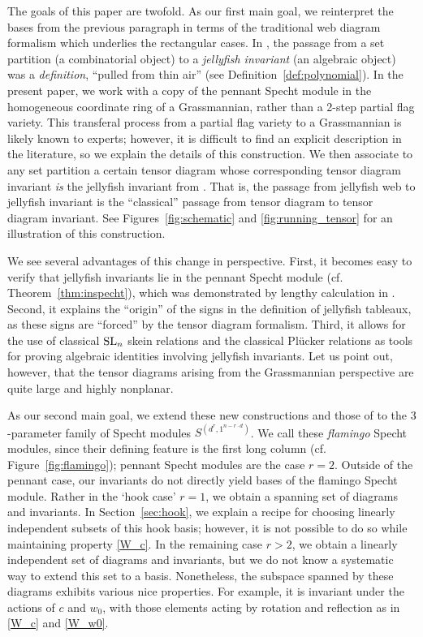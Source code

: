 \documentclass[ALCO, Unicode]{cedram}
\numberwithin{equation}{section}
\begin{document}
The goals of this paper are twofold. As our first main goal, we reinterpret the bases from the previous paragraph in terms of the traditional web diagram formalism which underlies the  rectangular cases. In \cite{Patrias.Pechenik.Striker}, the passage from a set partition (a combinatorial object) to a {\sl jellyfish invariant} (an algebraic object) was a {\sl definition}, ``pulled from thin air'' (see \eg Definition~\ref{def:polynomial}). In the present paper, we work with a copy of the pennant Specht module in the homogeneous coordinate ring of a Grassmannian, rather than a 2-step partial flag variety. This transferal process from a partial flag variety to a Grassmannian is likely known to experts; however, it is difficult to find an explicit description in the literature, so we explain the details of this construction. We then associate to any set partition a certain tensor diagram whose corresponding tensor diagram invariant {\sl is} the jellyfish invariant from \cite{Patrias.Pechenik.Striker}. That is, the passage from jellyfish web to jellyfish invariant is the ``classical'' passage from tensor diagram to tensor diagram invariant. See Figures~\ref{fig:schematic} and \ref{fig:running_tensor} for an illustration of this construction. 

We see several advantages of this change in perspective. First, it becomes easy to verify that jellyfish invariants lie in the pennant Specht module (cf. Theorem~\ref{thm:inspecht}), which was demonstrated by lengthy calculation in \loccit. Second, it explains the ``origin'' of the signs in the definition of jellyfish tableaux, as these signs are ``forced'' by the tensor diagram formalism. Third, it allows for the use of classical ${\rm SL}_n$ skein relations and the classical Pl\"ucker relations as tools for proving algebraic identities involving jellyfish invariants. Let us point out, however, that the tensor diagrams arising from the Grassmannian perspective are quite large and highly nonplanar.

As our second main goal, we extend these new constructions and those of \cite{Patrias.Pechenik.Striker} to the $3$-parameter family of Specht modules $S^{(d^r,1^{n-r\cdot d})}$. We call these \emph{flamingo} Specht modules, since their defining feature is the first long column (cf. Figure~\ref{fig:flamingo}); pennant Specht modules are the case $r=2$. Outside of the pennant case, our invariants do not directly yield bases of the flamingo Specht module. Rather in the `hook case' $r=1$, we obtain a spanning set of diagrams and invariants. In Section~\ref{sec:hook}, we explain a recipe for choosing linearly independent subsets of this hook basis; however, it is not possible to do so while maintaining property \ref{W_c}. In the remaining case $r>2$, we obtain a linearly independent set of diagrams and invariants, but we do not know a systematic way to extend this set to a basis. Nonetheless, the subspace spanned by these diagrams exhibits various nice properties. For example, it is invariant under the actions of $c$ and $w_0$, with those elements acting by rotation and reflection as in \ref{W_c} and \ref{W_w0}.
\end{document}
